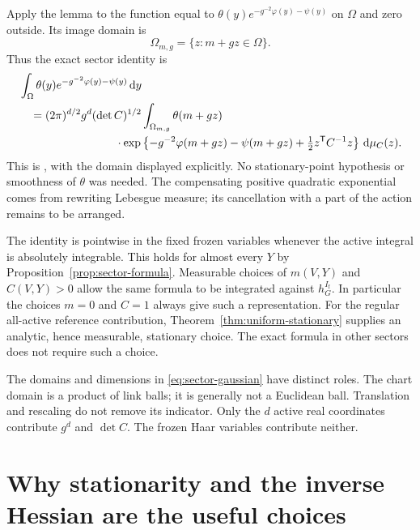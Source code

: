 \documentclass[11pt,reqno]{amsart}
\numberwithin{equation}{section}
\theoremstyle{definition}
\theoremstyle{remark}
\newcommand{\dd}{\mathrm d}
\newcommand{\If}{I_{\mathrm f}}
\begin{document}
Apply the lemma to the function equal to
\(\theta(y)e^{-g^{-2}\varphi(y)-\psi(y)}\) on \(\Omega\) and zero
outside. Its image domain is
\begin{equation}
                   \Omega_{m,g}=\{z:m+gz\in\Omega\}.
 \label{eq:rescaled-domain}
\end{equation}
Thus the exact sector identity is
\begin{equation}
 \begin{split}
 &\int_\Omega\theta(y)e^{-g^{-2}\varphi(y)-\psi(y)}\,\dd y\\
 &\quad=(2\pi)^{d/2}g^d(\det C)^{1/2}
      \int_{\Omega_{m,g}}\theta(m+gz)\\
 &\hspace{30mm}\cdot\exp\left\{-g^{-2}\varphi(m+gz)
             -\psi(m+gz)+\tfrac12z^{\mathsf T}C^{-1}z\right\}
                                                    \,\dd\mu_C(z).
 \end{split}
 \label{eq:sector-gaussian}
\end{equation}
This is \cite[Lemma~11.3 and (11.10), p.~38]{Main}, with the domain
displayed explicitly. No stationary-point hypothesis or smoothness
of \(\theta\) was needed. The compensating positive quadratic
exponential comes from rewriting Lebesgue measure; its cancellation
with a part of the action remains to be arranged.

The identity is pointwise in the fixed frozen variables whenever
the active integral is absolutely integrable. This holds for almost
every \(Y\) by Proposition~\ref{prop:sector-formula}. Measurable
choices of \(m(V,Y)\) and \(C(V,Y)>0\) allow the same formula
to be integrated against \(h_G^{\If}\). In particular the choices
\(m=0\) and \(C=1\) always give such a representation.
For the regular all-active reference contribution,
Theorem~\ref{thm:uniform-stationary} supplies an analytic, hence
measurable, stationary choice. The exact formula in other sectors
does not require such a choice.

The domains and dimensions in \eqref{eq:sector-gaussian} have distinct
roles. The chart domain is a product of link balls; it is generally
not a Euclidean ball. Translation and rescaling do not remove its
indicator. Only the \(d\) active real coordinates contribute
\(g^d\) and \(\det C\). The frozen Haar variables contribute neither.

\section{Why stationarity and the inverse Hessian are the useful choices}
\label{sec:stationary}
\end{document}
